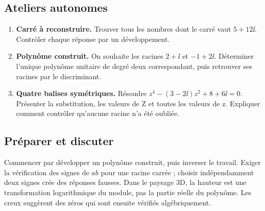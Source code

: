 \subsection{Ateliers autonomes}
\begin{enumerate}
\item \textbf{Carré à reconstruire.} Trouver tous les nombres dont le carré vaut $5+12\ii$. Contrôler chaque réponse par un développement.
\item \textbf{Polynôme construit.} On souhaite les racines $2+\ii$ et $-1+2\ii$. Déterminer l'unique polynôme unitaire de degré deux correspondant, puis retrouver ses racines par le discriminant.
\item \textbf{Quatre balises symétriques.} Résoudre $z^4-(3-2\ii)z^2+8+6\ii=0$. Présenter la substitution, les valeurs de Z et toutes les valeurs de z. Expliquer comment contrôler qu'aucune racine n'a été oubliée.
\end{enumerate}
\ifprof
\subsection{Préparer et discuter}
Commencer par développer un polynôme construit, puis inverser le travail. Exiger la vérification des signes de $ab$ pour une racine carrée ; choisir indépendamment deux signes crée des réponses fausses. Dans le paysage 3D, la hauteur est une transformation logarithmique du module, pas la partie réelle du polynôme. Les creux suggèrent des zéros qui sont ensuite vérifiés algébriquement.

\fi
